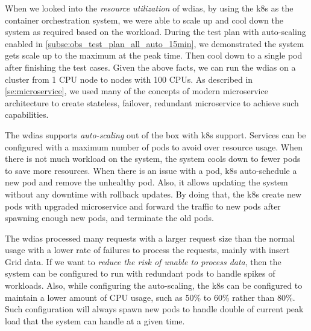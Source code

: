 When we looked into the \emph{resource utilization} of \acrshort{wdias}, by using the \acrshort{k8s} as the container orchestration system, we were able to scale up and cool down the system as required based on the workload. During the test plan with auto-scaling enabled in \cref{subse:obs_test_plan_all_auto_15min}, we demonstrated the system gets scale up to the maximum at the peak time. Then cool down to a single pod after finishing the test cases. Given the above facts, we can run the \acrshort{wdias} on a cluster from 1 CPU node to nodes with 100 CPUs. As described in \cref{se:microservice}, we used many of the concepts of modern microservice architecture to create stateless, failover, redundant microservice to achieve such capabilities.

The \acrshort{wdias} supports \emph{auto-scaling} out of the box with \acrshort{k8s} support. Services can be configured with a maximum number of pods to avoid over resource usage. When there is not much workload on the system, the system cools down to fewer pods to save more resources. When there is an issue with a pod, \acrshort{k8s} auto-schedule a new pod and remove the unhealthy pod. Also, it allows updating the system without any downtime with rollback updates. By doing that, the \acrshort{k8s} create new pods with upgraded microservice and forward the traffic to new pods after spawning enough new pods, and terminate the old pods.

The \acrshort{wdias} processed many requests with a larger request size than the normal usage with a lower rate of failures to process the requests, mainly with insert Grid data. If we want to \emph{reduce the risk of unable to process data}, then the system can be configured to run with redundant pods to handle spikes of workloads. Also, while configuring the auto-scaling, the \acrshort{k8s} can be configured to maintain a lower amount of CPU usage, such as 50\% to 60\% rather than 80\%. Such configuration will always spawn new pods to handle double of current peak load that the system can handle at a given time.
